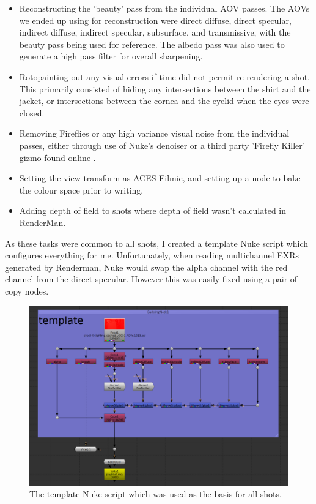 \documentclass[11pt]{article}
\begin{document}
\begin{itemize}

\item Reconstructing the 'beauty' pass from the individual AOV passes. The AOVs we ended up using for reconstruction were direct diffuse, direct specular, indirect diffuse, indirect specular, subsurface, and transmissive, with the beauty pass being used for reference. The albedo pass was also used to generate a high pass filter for overall sharpening.

\item Rotopainting out any visual errors if time did not permit re-rendering a shot. This primarily consisted of hiding any intersections between the shirt and the jacket, or intersections between the cornea and the eyelid when the eyes were closed.

\item Removing Fireflies or any high variance visual noise from the individual passes, either through use of Nuke's denoiser or a third party 'Firefly Killer' gizmo found online \cite{muller_2015}.

\item Setting the view transform as ACES Filmic, and setting up a node to bake the colour space prior to writing.

\item Adding depth of field to shots where depth of field wasn't calculated in RenderMan.

\end{itemize}

As these tasks were common to all shots, I created a template Nuke script which configures everything for me. Unfortunately, when reading multichannel EXRs generated by Renderman, Nuke would swap the alpha channel with the red channel from the direct specular. However this was easily fixed using a pair of copy nodes.

\begin{figure}[htbp]\centering
	\includegraphics[width=1.0\linewidth]{images/compTemplate.png}
	\caption{\label{figure:compTemplate} The template Nuke script which was used as the basis for all shots.}
\end{figure}
\end{document}
